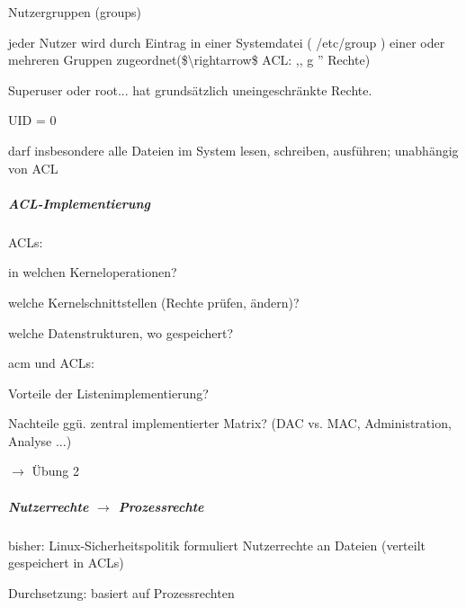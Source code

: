 \documentclass[a4paper]{article}
\begin{document}
\begin{multicols}{3}
    Nutzergruppen (groups)

    \begin{itemize*}
        \item
        jeder Nutzer wird durch Eintrag in einer Systemdatei ( /etc/group )
        einer oder mehreren Gruppen zugeordnet(\$\textbackslash rightarrow\$
        ACL: ,, g '' Rechte)
    \end{itemize*}

    Superuser oder root... hat grundsätzlich uneingeschränkte Rechte.

    \begin{itemize*}
        \item
        UID = 0
        \item
        darf insbesondere alle Dateien im System lesen, schreiben, ausführen;
        unabhängig von ACL
    \end{itemize*}


    \subparagraph{ACL-Implementierung}

    \begin{itemize*}
        \item
        ACLs:
        \begin{itemize*}
            \item in welchen Kerneloperationen?
            \item welche Kernelschnittstellen (Rechte prüfen, ändern)?
            \item welche Datenstrukturen, wo gespeichert?
        \end{itemize*}
        \item
        acm und ACLs:
        \begin{itemize*}
            \item Vorteile der Listenimplementierung?
            \item Nachteile ggü. zentral implementierter Matrix? (DAC vs. MAC, Administration, Analyse ...)
        \end{itemize*}
        \item
        $\rightarrow$  Übung 2
    \end{itemize*}


    \subparagraph{Nutzerrechte $\rightarrow$
        Prozessrechte}

    bisher: Linux-Sicherheitspolitik formuliert Nutzerrechte an Dateien
    (verteilt gespeichert in ACLs)

    Durchsetzung: basiert auf Prozessrechten


\end{multicols}
\end{document}
